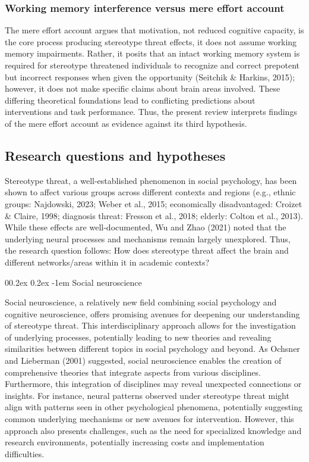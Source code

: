 \documentclass[
  stu, a4paper,floatsintext]{apa7}
\makeatletter
\let\oldparagraph\paragraph
\renewcommand{\paragraph}[1]{\oldparagraph{#1}\mbox{}}
\renewcommand{\paragraph}{\@startsection{paragraph}{4}{\parindent}%
  {0\baselineskip \@plus 0.2ex \@minus 0.2ex}%
  {-1em}%
  {\normalfont\normalsize\bfseries\itshape\typesectitle}}
\renewcommand{\paragraph}{\@startsection{paragraph}{4}{\parindent}%
  {0\baselineskip \@plus 0.2ex \@minus 0.2ex}%
  {-1em}%
  {\normalfont\normalsize\bfseries\typesectitle}}
\makeatother
\begin{document}
\subsubsection{Working memory interference versus mere effort account}\label{working-memory-interference-versus-mere-effort-account}

The mere effort account argues that motivation, not reduced cognitive capacity, is the core process producing stereotype threat effects, it does not assume working memory impairments.
Rather, it posits that an intact working memory system is required for stereotype threatened individuals to recognize and correct prepotent but incorrect responses when given the opportunity (Seitchik \& Harkins, 2015); however, it does not make specific claims about brain areas involved.
These differing theoretical foundations lead to conflicting predictions about interventions and task performance.
Thus, the present review interprets findings of the mere effort account as evidence against its third hypothesis.

\subsection{Research questions and hypotheses}\label{research-questions-and-hypotheses}

Stereotype threat, a well-established phenomenon in social psychology, has been shown to affect various groups across different contexts and regions (e.g., ethnic groups: Najdowski, 2023; Weber et al., 2015; economically disadvantaged: Croizet \& Claire, 1998; diagnosis threat: Fresson et al., 2018; elderly: Colton et al., 2013).
While these effects are well-documented, Wu and Zhao (2021) noted that the underlying neural processes and mechanisms remain largely unexplored.
Thus, the research question follows: How does stereotype threat affect the brain and different networks/areas within it in academic contexts?

\paragraph{Social neuroscience}\label{social-neuroscience}

Social neuroscience, a relatively new field combining social psychology and cognitive neuroscience, offers promising avenues for deepening our understanding of stereotype threat.
This interdisciplinary approach allows for the investigation of underlying processes, potentially leading to new theories and revealing similarities between different topics in social psychology and beyond. As Ochsner and Lieberman (2001) suggested, social neuroscience enables the creation of comprehensive theories that integrate aspects from various disciplines.
Furthermore, this integration of disciplines may reveal unexpected connections or insights. For instance, neural patterns observed under stereotype threat might align with patterns seen in other psychological phenomena, potentially suggesting common underlying mechanisms or new avenues for intervention.
However, this approach also presents challenges, such as the need for specialized knowledge and research environments, potentially increasing costs and implementation difficulties.
\end{document}
